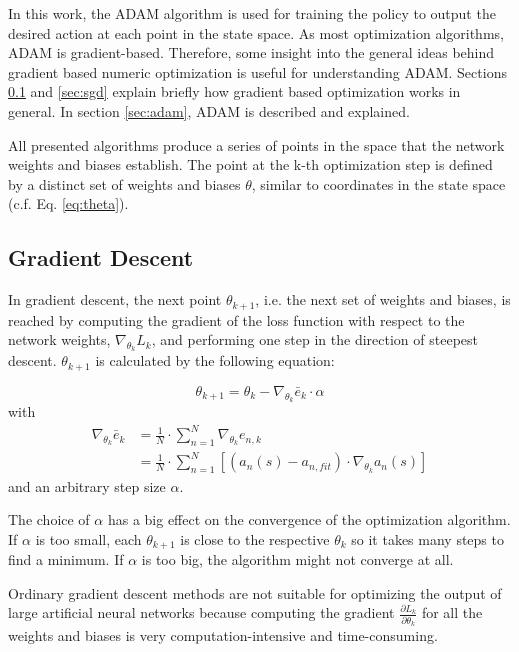 In this work, the ADAM algorithm is used for training the policy to output the desired action at each point in the state space. As most optimization algorithms, ADAM is gradient-based. Therefore, some insight into the general ideas behind gradient based numeric optimization is useful for understanding ADAM. Sections \ref{sec:grad_desc} and \ref{sec:sgd} explain briefly how gradient based optimization works in general. In section \ref{sec:adam}, ADAM is described and explained.

All presented algorithms produce a series of points in the space that the network weights and biases establish. The point at the k-th optimization step is defined by a distinct set of weights and biases $\theta$, similar to coordinates in the state space (c.f. Eq. \ref{eq:theta}).

\subsection{Gradient Descent}
\label{sec:grad_desc}

In gradient descent, the next point $\theta_{k+1}$, i.e. the next set of weights and biases, is reached by computing the gradient of the loss function with respect to the network weights, $\nabla_{\theta_k}L_k$, and performing one step in the direction of steepest descent. $\theta_{k+1}$ is calculated by the following equation:

\begin{equation}
\theta_{k+1} = \theta_k - \nabla_{\theta_k}\bar{e}_k\cdot \alpha
\label{eq:gd_update}
\end{equation}
with
\begin{align}
\nabla_{\theta_k}\bar{e}_k &=\frac{1}{N}\cdot\sum_{n=1}^{N}\nabla_{\theta_k}e_{n,k} \\
&=\frac{1}{N}\cdot\sum_{n=1}^{N}[(a_n(s)-a_{n,fit})\cdot\nabla_{\theta_k}a_n(s)]
\end{align}
and an arbitrary step size $\alpha$.

The choice of $\alpha$ has a big effect on the convergence of the optimization algorithm. If $\alpha$ is too small, each $\theta_{k+1}$ is close to the respective $\theta_{k}$ so it takes many steps to find a minimum. If $\alpha$ is too big, the algorithm might not converge at all.

Ordinary gradient descent methods are not suitable for optimizing the output of large artificial neural networks because computing the gradient $\frac{\partial L_k}{\partial \theta_k}$ for all the weights and biases is very computation-intensive and time-consuming.

